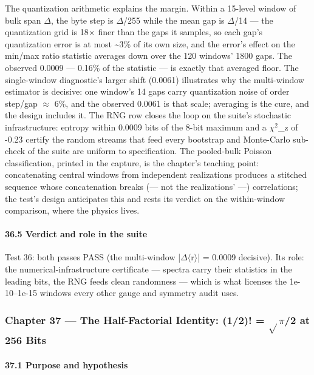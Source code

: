 \documentclass[10pt]{article}
\begin{document}
The quantization arithmetic explains the margin. Within a 15-level window of bulk span $\Delta$, the byte step is $\Delta$/255 while the mean gap is $\Delta$/14 --- the quantization grid is 18$\times$ finer than the gaps it samples, so each gap's quantization error is at most \textasciitilde{}3\% of its own size, and the error's effect on the min/max ratio statistic averages down over the 120 windows' 1800 gaps. The observed 0.0009 --- 0.16\% of the statistic --- is exactly that averaged floor. The single-window diagnostic's larger shift (0.0061) illustrates why the multi-window estimator is decisive: one window's 14 gaps carry quantization noise of order step/gap $\approx$ 6\%, and the observed 0.0061 is that scale; averaging is the cure, and the design includes it. The RNG row closes the loop on the suite's stochastic infrastructure: entropy within 0.0009 bits of the 8-bit maximum and a $\chi$$^2$\_z of -0.23 certify the random streams that feed every bootstrap and Monte-Carlo sub-check of the suite are uniform to specification. The pooled-bulk Poisson classification, printed in the capture, is the chapter's teaching point: concatenating central windows from independent realizations produces a stitched sequence whose concatenation breaks (--- not the realizations' ---) correlations; the test's design anticipates this and rests its verdict on the within-window comparison, where the physics lives.

\paragraph{36.5 Verdict and role in the suite}

Test 36: both passes PASS (the multi-window |$\Delta$$\langle$r$\rangle$| = 0.0009 decisive). Its role: the numerical-infrastructure certificate --- spectra carry their statistics in the leading bits, the RNG feeds clean randomness --- which is what licenses the 1e-10--1e-15 windows every other gauge and symmetry audit uses.

\subsubsection{Chapter 37 --- The Half-Factorial Identity: (1/2)! = $\sqrt{}$$\pi$/2 at 256 Bits}

\paragraph{37.1 Purpose and hypothesis}
\end{document}
